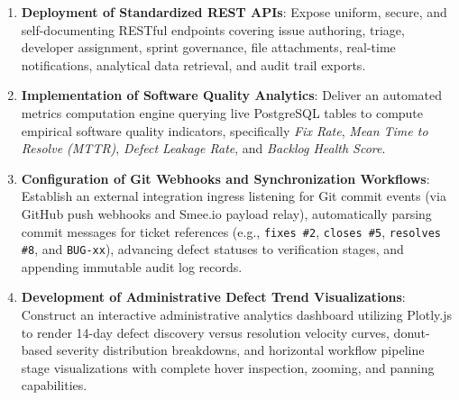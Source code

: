 \documentclass[11pt,a4paper]{article}
\begin{document}
\begin{enumerate}
    \item \textbf{Deployment of Standardized REST APIs}: Expose uniform, secure, and self-documenting RESTful endpoints covering issue authoring, triage, developer assignment, sprint governance, file attachments, real-time notifications, analytical data retrieval, and audit trail exports.
    \item \textbf{Implementation of Software Quality Analytics}: Deliver an automated metrics computation engine querying live PostgreSQL tables to compute empirical software quality indicators, specifically \textit{Fix Rate}, \textit{Mean Time to Resolve (MTTR)}, \textit{Defect Leakage Rate}, and \textit{Backlog Health Score}.
    \item \textbf{Configuration of Git Webhooks and Synchronization Workflows}: Establish an external integration ingress listening for Git commit events (via GitHub push webhooks and Smee.io payload relay), automatically parsing commit messages for ticket references (e.g., \texttt{fixes \#2}, \texttt{closes \#5}, \texttt{resolves \#8}, and \texttt{BUG-xx}), advancing defect statuses to verification stages, and appending immutable audit log records.
    \item \textbf{Development of Administrative Defect Trend Visualizations}: Construct an interactive administrative analytics dashboard utilizing Plotly.js to render 14-day defect discovery versus resolution velocity curves, donut-based severity distribution breakdowns, and horizontal workflow pipeline stage visualizations with complete hover inspection, zooming, and panning capabilities.
\end{enumerate}
\end{document}
